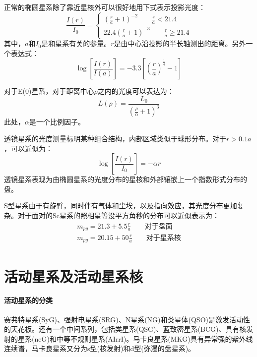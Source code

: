 正常的椭圆星系除了靠近星核外可以很好地用下式表示投影光度：
\begin{equation}
	\frac{I(r)}{I_{0}}=\left\{
	\begin{aligned}
		\left(\frac{r}{a}+1\right)^{-2}\qquad \frac{r}{a}<21.4 \\
		22.4\left(\frac{r}{a}+1\right)^{-3}\qquad \frac{r}{a}\geq 21.4
	\end{aligned}
	\right
	.
\end{equation}
其中，$a$和$I_{0}$是和星系有关的参量。$r$是由中心沿投影的半长轴测出的距离。另外一个表达式：
\begin{equation}
	\log\left[\frac{I(r)}{I(a)}\right]=-3.3\left[\left(\frac{r}{a}\right)^{\frac{1}{4}}-1\right]
\end{equation}

对于E(0)星系，对于距离中心$\rho$之内的光度可以表达为：
\begin{equation}
	L(\rho)=\frac{L_{0}}{\left(\frac{\rho}{\alpha}+1\right)^3}
\end{equation}
此处，$\alpha$是一个比例因子。

透镜星系的光度测量标明某种组合结构，内部区域类似于球形分布。对于$r>0.1a$，可以近似为：
\begin{equation}
	\log\left[\frac{I(r)}{I_{0}}\right]=-\alpha r
\end{equation}
透镜星系表现为由椭圆星系的光度分布的星核和外部镶嵌上一个指数形式分布的盘。

S型星系由于有旋臂，同时伴有气体和尘埃，以及指向效应，其光度分布更加复杂。对于面对的Sc星系的照相星等没平方角秒的分布可以近似表示为：
\begin{equation}
	\begin{aligned}
		m_{pg}=21.3+5.5\frac{r}{a}\qquad \mbox{对于盘面}\\
		m_{pg}=20.15+50\frac{r}{a}\qquad \mbox{对于星系核}\\
	\end{aligned}
\end{equation}
\section{活动星系及活动星系核}
\paragraph{活动星系的分类}
赛弗特星系(SyG)、强射电星系(SRG)、N星系(NG)和类星体(QSO)是激发活动性的天花板。还有一个中间系列，包括类星系(QSG)、蓝致密星系(BCG)、具有核发射的星系(neG)和中等不规则星系(AIrrI)。马卡良星系(MKG)具有异常强的紫外线连续谱，马卡良星系又分为s型(核发射)和d型(弥漫的盘星系)。
